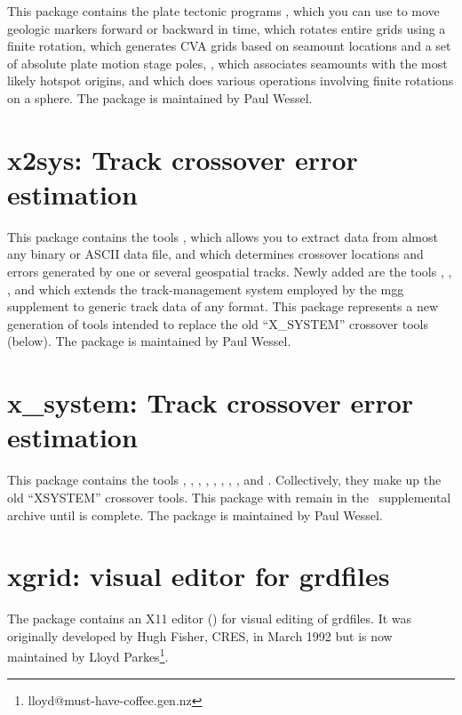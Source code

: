 This package contains the plate tectonic programs ,
which you can use to move geologic markers forward or backward in time, 
 which rotates entire grids using a finite rotation,
 which generates CVA grids based on seamount locations
and a set of absolute plate motion stage poles, ,
which associates seamounts with the most likely hotspot origins, and 
which does various operations involving finite rotations on a sphere.  The package
is maintained by Paul Wessel.

\section{x2sys: Track crossover error estimation}

This package contains the tools ,
which allows you to extract data from almost any binary or ASCII
data file, and  which determines crossover
locations and errors generated by one or several geospatial tracks.
Newly added are the tools ,  , ,
and  which extends the track-management system
employed by the mgg supplement to generic track data of any format.
This package represents a new generation of tools intended to replace the old
``X\_SYSTEM'' crossover tools (below).  The package is maintained
by Paul Wessel.

\section{x\_system: Track crossover error estimation}

This package contains the tools ,
, , , ,
, , , and
.
Collectively, they make up the old ``XSYSTEM'' crossover tools.  This
package with remain in the \GMT\ supplemental archive until  is complete.
The package is maintained by Paul Wessel.

\section{xgrid: visual editor for grdfiles}

The package contains an X11 editor () for visual
editing of grdfiles.  It was originally developed by Hugh Fisher, CRES,
in March 1992 but is now maintained by Lloyd Parkes\footnote{lloyd@must-have-coffee.gen.nz}.
